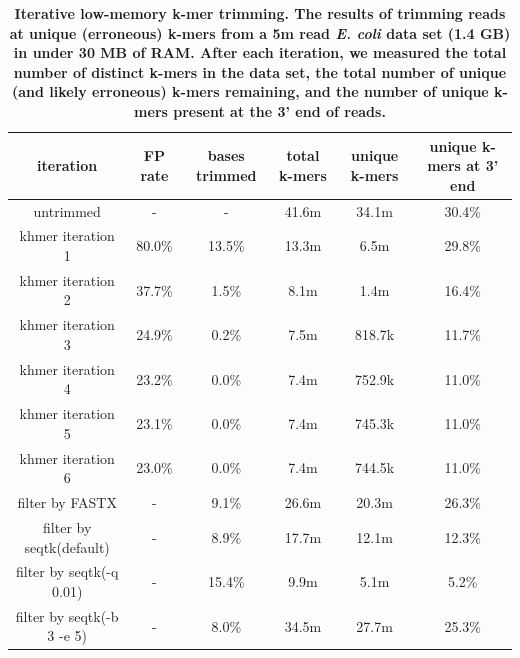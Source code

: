 \documentclass[10pt]{article}
\begin{document}
\begin{table}[!ht]
\caption{
\bf{Iterative low-memory k-mer trimming.  The results of trimming
  reads at unique (erroneous) k-mers from a 5m read {\em E. coli} data set (1.4 GB)
  in under 30 MB of RAM.  After each iteration, we measured the
  total number of distinct k-mers in the data set, the total number
  of unique (and likely erroneous) k-mers remaining, and the
  number of unique k-mers present at the 3' end of reads.}}
\begin{tabular}{ | c | c | c | c | c | c |}
\hline
iteration & FP rate & bases trimmed & total k-mers & unique k-mers & 
unique k-mers at 3' end \\
\hline
untrimmed                           &      -  &      - & 41.6m & 34.1m & 30.4\%  \\
khmer iteration 1                   & 80.0\%  & 13.5\% & 13.3m &  6.5m & 29.8\% \\
khmer iteration 2                   & 37.7\%  &  1.5\% &  8.1m &  1.4m & 16.4\% \\
khmer iteration 3                   & 24.9\%  &  0.2\% &  7.5m & 818.7k & 11.7\% \\
khmer iteration 4                   & 23.2\%  &  0.0\% &  7.4m & 752.9k & 11.0\% \\
khmer iteration 5                   & 23.1\%  &  0.0\% &  7.4m & 745.3k & 11.0\% \\
khmer iteration 6                   & 23.0\%  &  0.0\% &  7.4m & 744.5k & 11.0\% \\
filter by FASTX                     &      -  &  9.1\% & 26.6m & 20.3m & 26.3\% \\
filter by seqtk(default)            &      -  &  8.9\% & 17.7m & 12.1m & 12.3\% \\
filter by seqtk(-q 0.01)            &      -  & 15.4\% &  9.9m &  5.1m &  5.2\% \\
filter by seqtk(-b 3 -e 5)          &      -  &  8.0\% & 34.5m & 27.7m & 25.3\% \\
\end{tabular}
\begin{flushleft}
\end{flushleft}
\label{table:loop_trim}
\end{table}


\end{document}
